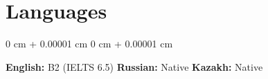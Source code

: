 \documentclass[10pt, letterpaper]{article}
\newenvironment{onecolentry}{
    \begin{adjustwidth}{
        0 cm + 0.00001 cm
    }{
        0 cm + 0.00001 cm
    }
}{
    \end{adjustwidth}
} %
\begin{document}
\section{Languages}

\begin{onecolentry}
    \textbf{English:} B2 (IELTS 6.5) \hspace{1em}
    \textbf{Russian:} Native \hspace{1em}
    \textbf{Kazakh:} Native \hspace{1em}
\end{onecolentry}
\end{document}
